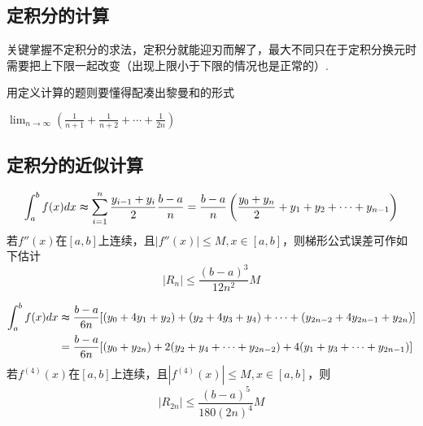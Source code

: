 \subsection{定积分的计算}
关键掌握不定积分的求法，定积分就能迎刃而解了，最大不同只在于定积分换元时需要把上下限一起改变（出现上限小于下限的情况也是正常的）.
\par 用定义计算的题则要懂得配凑出黎曼和的形式
\begin{exercise}
\label{limitrimsum}
$\displaystyle\lim_{n\to\infty}\left(\frac{1}{n+1}+\frac{1}{n+2}+\cdots+\frac{1}{2n}\right)$
\end{exercise}

\subsection{定积分的近似计算}
\begin{definition}[定积分梯形公式]
\[\int_a^bf(x)dx\thickapprox\sum_{i=1}^n\frac{y_{i-1}+y_i}{2}\frac{b-a}{n}=\frac{b-a}{n}\left(\frac{y_0+y_n}{2}+y_1+y_2+\cdots+y_{n-1}\right)\]
若$f''(x)$在$[a,b]$上连续，且$|f''(x)|\leq M,x\in[a,b]$，则梯形公式误差可作如下估计
\[|R_n|\leq\frac{(b-a)^3}{12n^2}M\]
\end{definition}
\begin{definition}
\[\begin{aligned}
\int_a^bf(x)dx &\thickapprox\frac{b-a}{6n}[(y_0+4y_1+y_2)+(y_2+4y_3+y_4)+\cdots+(y_{2n-2}+4y_{2n-1}+y_{2n})]\\
&=\frac{b-a}{6n}[(y_0+y_{2n})+2(y_2+y_4+\cdots+y_{2n-2})+4(y_1+y_3+\cdots+y_{2n-1})]\end{aligned}\]
若$f^{(4)}(x)$在$[a,b]$上连续，且$|f^{(4)}(x)|\leq M,x\in[a,b]$，则
\[|R_{2n}|\leq\frac{(b-a)^5}{180(2n)^4}M\]
\end{definition}


